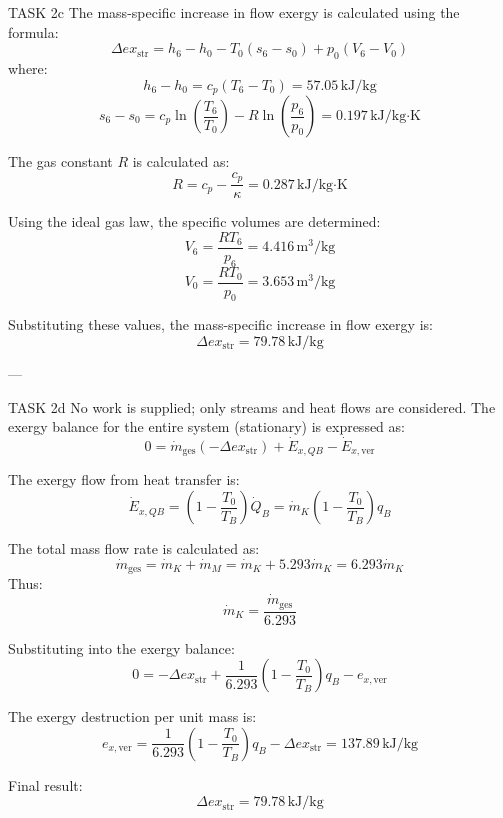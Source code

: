 TASK 2c  
The mass-specific increase in flow exergy is calculated using the formula:  
\[
\Delta ex_{\text{str}} = h_6 - h_0 - T_0 (s_6 - s_0) + p_0 (V_6 - V_0)
\]  
where:  
\[
h_6 - h_0 = c_p (T_6 - T_0) = 57.05 \, \text{kJ/kg}
\]  
\[
s_6 - s_0 = c_p \ln \left( \frac{T_6}{T_0} \right) - R \ln \left( \frac{p_6}{p_0} \right) = 0.197 \, \text{kJ/kg·K}
\]  

The gas constant \( R \) is calculated as:  
\[
R = c_p - \frac{c_p}{\kappa} = 0.287 \, \text{kJ/kg·K}
\]  

Using the ideal gas law, the specific volumes are determined:  
\[
V_6 = \frac{RT_6}{p_6} = 4.416 \, \text{m}^3/\text{kg}
\]  
\[
V_0 = \frac{RT_0}{p_0} = 3.653 \, \text{m}^3/\text{kg}
\]  

Substituting these values, the mass-specific increase in flow exergy is:  
\[
\Delta ex_{\text{str}} = 79.78 \, \text{kJ/kg}
\]  

---

TASK 2d  
No work is supplied; only streams and heat flows are considered. The exergy balance for the entire system (stationary) is expressed as:  
\[
0 = \dot{m}_{\text{ges}} (-\Delta ex_{\text{str}}) + \dot{E}_{x,QB} - \dot{E}_{x,\text{ver}}
\]  

The exergy flow from heat transfer is:  
\[
\dot{E}_{x,QB} = \left( 1 - \frac{T_0}{T_B} \right) \dot{Q}_B = \dot{m}_K \left( 1 - \frac{T_0}{T_B} \right) q_B
\]  

The total mass flow rate is calculated as:  
\[
\dot{m}_{\text{ges}} = \dot{m}_K + \dot{m}_M = \dot{m}_K + 5.293 \dot{m}_K = 6.293 \dot{m}_K
\]  
Thus:  
\[
\dot{m}_K = \frac{\dot{m}_{\text{ges}}}{6.293}
\]  

Substituting into the exergy balance:  
\[
0 = -\Delta ex_{\text{str}} + \frac{1}{6.293} \left( 1 - \frac{T_0}{T_B} \right) q_B - e_{x,\text{ver}}
\]  

The exergy destruction per unit mass is:  
\[
e_{x,\text{ver}} = \frac{1}{6.293} \left( 1 - \frac{T_0}{T_B} \right) q_B - \Delta ex_{\text{str}} = 137.89 \, \text{kJ/kg}
\]  

Final result:  
\[
\Delta ex_{\text{str}} = 79.78 \, \text{kJ/kg}
\]